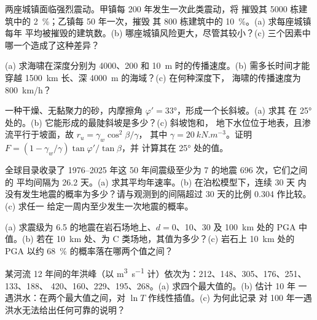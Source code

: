 \begin{exercise}[$\star$]\label{exo:b2:geological-hazards:2}
两座城镇面临强烈震动。甲镇每 200 年发生一次此类震动，将
摧毁其 5000 栋建筑中的 \qty{2}{\percent}；乙镇每 50 年一次，摧毁
其 800 栋建筑中的 \qty{10}{\percent}。(a) 求每座城镇每年
平均被摧毁的建筑数。(b) 哪座城镇风险更大，尽管其较小？(c)
三个因素中哪一个造成了这种差异？
\end{exercise}

\begin{exercise}[$\star$]\label{exo:b2:geological-hazards:3}
(a) 求海啸在深度分别为 4000、200 和 \qty{10}{m} 时的传播速度。(b) 需多长时间才能穿越
\qty{1500}{km} 长、深 \qty{4000}{m} 的海域？(c) 在何种深度下，
海啸的传播速度为 \qty{800}{km/h}？
\end{exercise}

\begin{exercise}[$\star$]\label{exo:b2:geological-hazards:4}
一种干燥、无黏聚力的砂，内摩擦角 $\varphi' = \ang{33}$，形成一个长斜坡。(a) 求其
在 \ang{25} 处的。(b) 它能形成的最陡斜坡是多少？(c) 斜坡饱和，
地下水位位于地表，且渗流平行于坡面，故 $r_u = \gamma_w\cos^2\beta/\gamma$，
其中 $\gamma = \qty{20}{kN.m^{-3}}$。证明 $F = (1 - \gamma_w/\gamma)\tan\varphi'/\tan\beta$，并
计算其在 \ang{25} 处的值。
\end{exercise}

\begin{exercise}[$\star\star$]\label{exo:b2:geological-hazards:5}
全球目录收录了 1976--2025 年这 50 年间震级至少为 7 的地震 696 次，它们之间的
平均间隔为 26.2 天。(a) 求其平均年速率。(b) 在泊松模型下，连续 30 天
内没有发生地震的概率为多少？请与观测到的间隔超过 30 天的比例
0.304 作比较。(c) 求任一
给定一周内至少发生一次地震的概率。
\end{exercise}

\begin{exercise}[$\star\star$]\label{exo:b2:geological-hazards:6}
(a) 求震级为 6.5 的地震在岩石场地上、$d = 0$、10、30 及
\qty{100}{km} 处的 PGA 中值。(b) 若在 \qty{10}{km} 处、为 C 类场地，其值为多少？(c)
岩石上 \qty{10}{km} 处的 PGA 以约 \qty{68}{\percent} 的概率落在哪两个值之间？
\end{exercise}

\begin{exercise}[$\star\star$]\label{exo:b2:geological-hazards:7}
某河流 12 年间的年洪峰（以 \unit{m^3.s^{-1}} 计）依次为：212、148、305、176、251、133、188、
420、160、229、195、268。(a) 求四个最大值的。(b) 估计 10 年
一遇洪水：在两个最大值之间，对 $\ln T$ 作线性插值。(c) 为何此记录
对 100 年一遇洪水无法给出任何可靠的说明？
\end{exercise}

